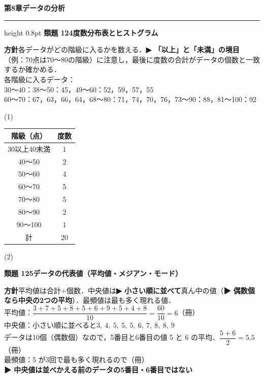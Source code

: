 \documentclass[a4paper,11pt]{ltjsarticle}
\newcommand{\ans}[2]{\Needspace{5\baselineskip}\vspace{6pt}%
  {\sffamily\bfseries 類題 #1\quad #2}\par}
\newcommand{\point}[1]{\textsf{\bfseries ▶ #1}}
\newcommand{\shouans}[2]{\Needspace{8\baselineskip}\vspace{10pt}\markboth{解答\quad #1\quad #2}{}%
  {\sffamily\bfseries\Large #1\quad #2\par}\vspace{2pt}\hrule height 0.8pt\vspace{2pt}}
\begin{document}
\shouans{第8章}{データの分析}
\ans{124}{度数分布表とヒストグラム}
\begin{kai}
\textbf{方針}\quad 各データがどの階級に入るかを数える．\point{「以上」と「未満」の境目}（例：70点は70〜80の階級）に注意し，最後に度数の合計がデータの個数と一致するか確かめる．\\[2pt]
各階級に入るデータ：\\
\hspace*{1.5em}30〜40：38〜50：45，49〜60：52，59，57，55\\
\hspace*{1.5em}60〜70：67，63，66，64，68〜80：71，74，70，76，73〜90：88，81〜100：92\\[4pt]
\begin{minipage}[t]{0.45\linewidth}
(1)\\[2pt]
\renewcommand{\arraystretch}{1.1}
\begin{tabular}{c|c}
階級（点） & 度数\\ \hline
30以上40未満 & 1\\ 40〜50 & 2\\ 50〜60 & 4\\ 60〜70 & 5\\ 70〜80 & 5\\ 80〜90 & 2\\ 90〜100 & 1\\ \hline 計 & 20
\end{tabular}
\end{minipage}\hfill
\begin{minipage}[t]{0.5\linewidth}
(2)\\[2pt]
\end{minipage}
\end{kai}

\ans{125}{データの代表値（平均値・メジアン・モード）}
\begin{kai}
\textbf{方針}\quad 平均値は合計÷個数．中央値は\point{小さい順に並べて}真ん中の値（\point{偶数個なら中央の2つの平均}）．最頻値は最も多く現れる値．\\[2pt]
平均値：$\dfrac{3+7+5+8+5+6+9+5+4+8}{10}=\dfrac{60}{10}=6$（冊）\\[2pt]
中央値：小さい順に並べると\quad $3,\ 4,\ 5,\ 5,\ 5,\ 6,\ 7,\ 8,\ 8,\ 9$\\
\hspace*{1.5em}データは10個（偶数個）なので，5番目と6番目の値 5 と 6 の平均．\quad $\dfrac{5+6}2=5.5$（冊）\\[2pt]
最頻値：5 が3回で最も多く現れるので（冊）\\
\point{中央値は並べかえる前のデータの5番目・6番目ではない}
\end{kai}
\end{document}
